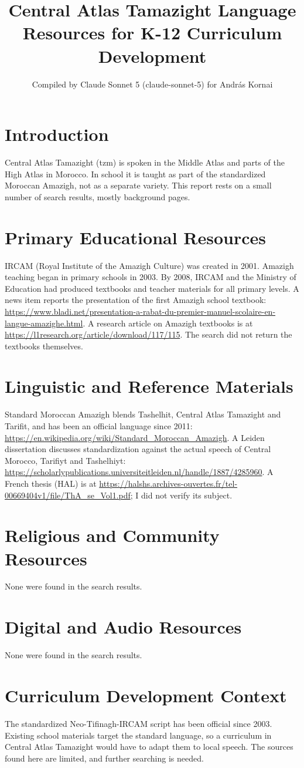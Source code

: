\documentclass[12pt]{article}
\title{Central Atlas Tamazight Language Resources for K-12 Curriculum Development}
\author{Compiled by Claude Sonnet 5 (claude-sonnet-5) for Andr\'as Kornai}
\date{}
\begin{document}
\maketitle
\section{Introduction}
Central Atlas Tamazight (tzm) is spoken in the Middle Atlas and parts of the High Atlas in Morocco. In school it is taught as part of the standardized Moroccan Amazigh, not as a separate variety. This report rests on a small number of search results, mostly background pages.
\section{Primary Educational Resources}
IRCAM (Royal Institute of the Amazigh Culture) was created in 2001. Amazigh teaching began in primary schools in 2003. By 2008, IRCAM and the Ministry of Education had produced textbooks and teacher materials for all primary levels. A news item reports the presentation of the first Amazigh school textbook: \url{https://www.bladi.net/presentation-a-rabat-du-premier-manuel-scolaire-en-langue-amazighe.html}. A research article on Amazigh textbooks is at \url{https://l1research.org/article/download/117/115}. The search did not return the textbooks themselves.
\section{Linguistic and Reference Materials}
Standard Moroccan Amazigh blends Tashelhit, Central Atlas Tamazight and Tarifit, and has been an official language since 2011: \url{https://en.wikipedia.org/wiki/Standard_Moroccan_Amazigh}. A Leiden dissertation discusses standardization against the actual speech of Central Morocco, Tarifiyt and Tashelhiyt: \url{https://scholarlypublications.universiteitleiden.nl/handle/1887/4285960}. A French thesis (HAL) is at \url{https://halshs.archives-ouvertes.fr/tel-00669404v1/file/ThA_se_Vol1.pdf}; I did not verify its subject.
\section{Religious and Community Resources}
None were found in the search results.
\section{Digital and Audio Resources}
None were found in the search results.
\section{Curriculum Development Context}
The standardized Neo-Tifinagh-IRCAM script has been official since 2003. Existing school materials target the standard language, so a curriculum in Central Atlas Tamazight would have to adapt them to local speech. The sources found here are limited, and further searching is needed.
\end{document}
